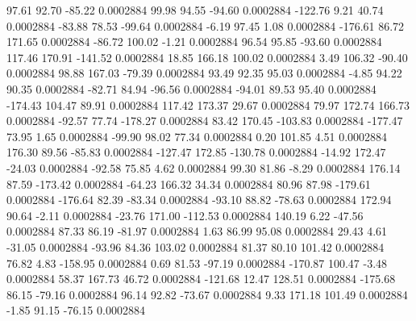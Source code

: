        97.61       92.70      -85.22     0.0002884
       99.98       94.55      -94.60     0.0002884
     -122.76        9.21       40.74     0.0002884
      -83.88       78.53      -99.64     0.0002884
       -6.19       97.45        1.08     0.0002884
     -176.61       86.72      171.65     0.0002884
      -86.72      100.02       -1.21     0.0002884
       96.54       95.85      -93.60     0.0002884
      117.46      170.91     -141.52     0.0002884
       18.85      166.18      100.02     0.0002884
        3.49      106.32      -90.40     0.0002884
       98.88      167.03      -79.39     0.0002884
       93.49       92.35       95.03     0.0002884
       -4.85       94.22       90.35     0.0002884
      -82.71       84.94      -96.56     0.0002884
      -94.01       89.53       95.40     0.0002884
     -174.43      104.47       89.91     0.0002884
      117.42      173.37       29.67     0.0002884
       79.97      172.74      166.73     0.0002884
      -92.57       77.74     -178.27     0.0002884
       83.42      170.45     -103.83     0.0002884
     -177.47       73.95        1.65     0.0002884
      -99.90       98.02       77.34     0.0002884
        0.20      101.85        4.51     0.0002884
      176.30       89.56      -85.83     0.0002884
     -127.47      172.85     -130.78     0.0002884
      -14.92      172.47      -24.03     0.0002884
      -92.58       75.85        4.62     0.0002884
       99.30       81.86       -8.29     0.0002884
      176.14       87.59     -173.42     0.0002884
      -64.23      166.32       34.34     0.0002884
       80.96       87.98     -179.61     0.0002884
     -176.64       82.39      -83.34     0.0002884
      -93.10       88.82      -78.63     0.0002884
      172.94       90.64       -2.11     0.0002884
      -23.76      171.00     -112.53     0.0002884
      140.19        6.22      -47.56     0.0002884
       87.33       86.19      -81.97     0.0002884
        1.63       86.99       95.08     0.0002884
       29.43        4.61      -31.05     0.0002884
      -93.96       84.36      103.02     0.0002884
       81.37       80.10      101.42     0.0002884
       76.82        4.83     -158.95     0.0002884
        0.69       81.53      -97.19     0.0002884
     -170.87      100.47       -3.48     0.0002884
       58.37      167.73       46.72     0.0002884
     -121.68       12.47      128.51     0.0002884
     -175.68       86.15      -79.16     0.0002884
       96.14       92.82      -73.67     0.0002884
        9.33      171.18      101.49     0.0002884
       -1.85       91.15      -76.15     0.0002884
